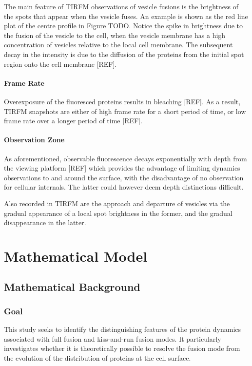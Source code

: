 \documentclass{report}
\begin{document}
The main feature of TIRFM observations of vesicle fusions is the brightness of the spots that appear when the vesicle fuses. An example is shown as the red line plot of the centre profile in Figure TODO. Notice the spike in brightness due to the fusion of the vesicle to the cell, when the vesicle membrane has a high concentration of vesicles relative to the local cell membrane. The subsequent decay in the intensity is due to the diffusion of the proteins from the initial spot region onto the cell membrane [REF].

\subsection{Frame Rate}
Overexposure of the fluoresced proteins results in bleaching [REF]. As a result, TIRFM snapshots are either of high frame rate for a short period of time, or low frame rate over a longer period of time [REF].

\subsection{Observation Zone}
As aforementioned, observable fluorescence decays exponentially with depth from the viewing platform [REF] which provides the advantage of limiting dynamics observations to and around the surface, with the disadvantage of no observation for cellular internals. The latter could however deem depth distinctions difficult.

Also recorded in TIRFM are the approach and departure of vesicles via the gradual appearance of a local spot brightness in the former, and the gradual disappearance in the latter.

\part{Mathematical Model}

\chapter{Mathematical Background}
\section{Goal}
This study seeks to identify the distinguishing features of the protein dynamics associated with full fusion and kiss-and-run fusion modes. It particularly investigates whether it is theoretically possible to resolve the fusion mode from the evolution of the distribution of proteins at the cell surface.
\end{document}
